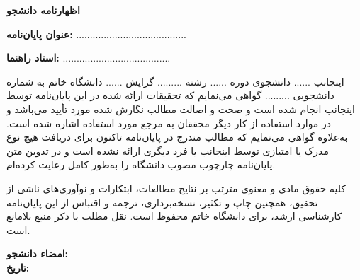 \thispagestyle{plain}

\setlength{\parskip}{12pt} %

\begin{center}
{\fontsize{14}{18}\selectfont\textbf{اظهارنامه دانشجو}}
\end{center}

\vspace{1cm}

{\fontsize{14}{18}\selectfont\textbf{عنوان پایان‌نامه:}}
........................................

{\fontsize{14}{18}\selectfont\textbf{استاد راهنما:}}
.......................................

\vspace{0.8cm}

{\fontsize{14}{18}\selectfont
اینجانب ...... دانشجوی دوره ...... رشته .........
گرایش ...... دانشگاه خاتم به شماره دانشجویی ......... گواهی می‌نمایم که
تحقیقات ارائه شده در این پایان‌نامه توسط اینجانب انجام شده است و صحت و اصالت مطالب نگارش شده
مورد تأیید می‌باشد و در موارد استفاده از کار دیگر محققان به مرجع مورد استفاده اشاره شده است.
به‌علاوه گواهی می‌نمایم که مطالب مندرج در پایان‌نامه تاکنون برای دریافت هیچ نوع مدرک یا امتیازی
توسط اینجانب یا فرد دیگری ارائه نشده است و در تدوین متن پایان‌نامه چارچوب مصوب دانشگاه را
به‌طور کامل رعایت کرده‌ام.


کلیه حقوق مادی و معنوی مترتب بر نتایج مطالعات، ابتکارات و نوآوری‌های ناشی از تحقیق، همچنین چاپ
و تکثیر، نسخه‌برداری، ترجمه و اقتباس از این پایان‌نامه کارشناسی ارشد، برای دانشگاه خاتم محفوظ است.
نقل مطلب با ذکر منبع بلامانع است.
}

\vspace{3cm}


\begin{flushleft}
{\fontsize{13}{16}\selectfont\textbf{امضاء دانشجو:}} \\[0.5cm]
{\fontsize{13}{16}\selectfont\textbf{تاریخ:}}
\end{flushleft}
